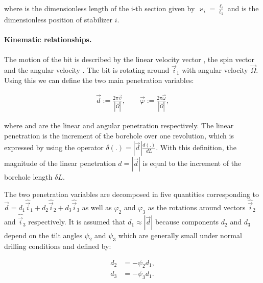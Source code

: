 where  is the dimensionless length of the i-th section given by $\varkappa_i = \frac{\ell_i}{\ell_1}$ and  is the dimensionless position of stabilizer $i$.

\paragraph{Kinematic relationships.} The motion of the bit is described by the linear velocity vector , the spin vector  and the angular velocity . The bit is rotating around $\vec{i}_1$ with angular velocity $\vec{\Omega}$. Using this we can define the two main penetration variables:

\begin{align}
	\vec{d} := \frac{2 \pi \vec{v}}{|\vec{\Omega}|}, \qquad \vec{\varphi} := \frac{2 \pi \vec{\omega}}{|\vec{\Omega}|}
	\label{eq:penetrationvectors},
\end{align}

where  and  are the linear and angular penetration respectively. The linear penetration is the increment of the borehole over one revolution, which is expressed by using the operator $\delta(.) = |\vec{d}|\frac{d(.)}{dL}$. With this definition, the magnitude of the linear penetration $d = |\vec{d}|$ is equal to the increment of the borehole length $\delta L$.

The two penetration variables are decomposed in five quantities corresponding to $\vec{d}=d_1\hat{\vec{i}}_1+d_2\hat{\vec{i}}_2+d_3\hat{\vec{i}}_3$ as well as $\varphi_2$ and $\varphi_3$ as the rotations around vectors $\hat{\vec{i}}_2$ and $\hat{\vec{i}}_3$ respectively. It is assumed that $d_1 \approx |\vec{d}|$ because components $d_2$ and $d_3$ depend on the tilt angles $\psi_2$ and $\psi_3$ which are generally small under normal drilling conditions and defined by:

\begin{align}
	{d_2} &= -\psi_{2} d_1, \nonumber \\ 
	{d_3} &= -\psi_{3} d_{1}.
	\label{eq:vector_d}
\end{align}

